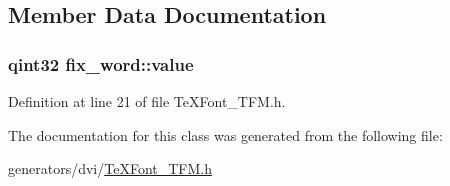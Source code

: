 \subsection{Member Data Documentation}
\hypertarget{classfix__word_af0db00b285e54bf5c2da670519149dc0}{
\subsubsection[{value}]{\setlength{\rightskip}{0pt plus 5cm}qint32 fix\+\_\+word\+::value}}\label{classfix__word_af0db00b285e54bf5c2da670519149dc0}


Definition at line 21 of file Te\+X\+Font\+\_\+\+T\+F\+M.\+h.



The documentation for this class was generated from the following file\+:\begin{DoxyCompactItemize}
\item 
generators/dvi/\hyperlink{TeXFont__TFM_8h}{Te\+X\+Font\+\_\+\+T\+F\+M.\+h}\end{DoxyCompactItemize}
